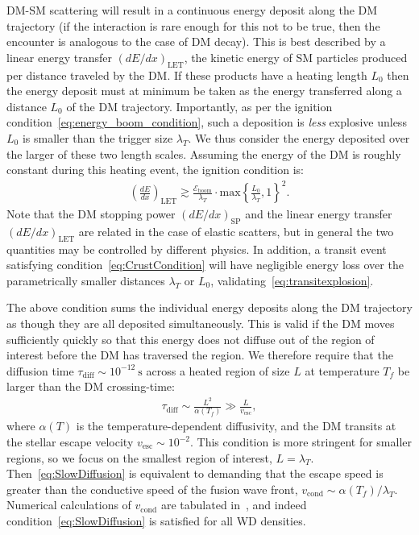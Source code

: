 \documentclass[preprintnumbers,amsmath,amssymb,prd,superscriptaddress]{revtex4}
\newcommand{\Eboom}{\mathcal{E}_\text{boom}}
\begin{document}
DM-SM scattering will result in a continuous energy deposit along the DM trajectory (if the interaction is rare enough for this not to be true, then the encounter is analogous to the case of DM decay).
This is best described by a linear energy transfer $(dE/dx)_\text{LET}$, the kinetic energy of SM particles produced per distance traveled by the DM.
If these products have a heating length $L_0$ then the energy deposit must at minimum be taken as the energy transferred along a distance $L_0$ of the DM trajectory.
Importantly, as per the ignition condition~\eqref{eq:energy_boom_condition}, such a deposition is \emph{less} explosive unless $L_0$ is smaller than the trigger size $\lambda_T$.
We thus consider the energy deposited over the larger of these two length scales.
Assuming the energy of the DM is roughly constant during this heating event, the ignition condition is:
\begin{align}
\label{eq:transitexplosion}
  \left( \frac{d E}{d x} \right)_\text{LET} \gtrsim
  \frac{\Eboom}{\lambda_T} \cdot \text{max}
  \left\{\frac{L_0}{\lambda_T}, 1 \right\}^2.
\end{align}
Note that the DM stopping power $(dE/dx)_\text{SP}$ and the linear energy transfer $(dE/dx)_\text{LET}$ are related in the case of elastic scatters, but in general the two quantities may be controlled by different physics.
In addition, a transit event satisfying condition~\eqref{eq:CrustCondition} will have negligible energy loss over the parametrically smaller distances $\lambda_T$ or $L_0$, validating~\eqref{eq:transitexplosion}.

The above condition sums the individual energy deposits along the DM trajectory as though they are all deposited simultaneously.
This is valid if the DM moves sufficiently quickly so that this energy does not diffuse out of the region of interest before the DM has traversed the region.
We therefore require that the diffusion time $\tau_\text{diff} \sim 10^{-12}~\text{s}$ across a heated region of size $L$ at temperature $T_f$ be larger than the DM crossing-time:
\begin{align}
  \tau_\text{diff} \sim \frac{L^2}{\alpha(T_f)} \gg
  \frac{L}{v_\text{esc}},
\label{eq:SlowDiffusion}
\end{align}
where $\alpha(T)$ is the temperature-dependent diffusivity, and the DM transits at the stellar escape velocity $v_\text{esc} \sim 10^{-2}$.
This condition is more stringent for smaller regions, so we focus on the smallest region of interest, $L = \lambda_T$.
Then~\eqref{eq:SlowDiffusion} is equivalent to demanding that the escape speed is greater than the conductive speed of the fusion wave front, $v_\text{cond} \sim \alpha(T_f) / \lambda_T$.
Numerical calculations of $v_\text{cond}$ are tabulated in~\cite{Woosley}, and indeed condition~\eqref{eq:SlowDiffusion} is satisfied for all WD densities.
\end{document}
